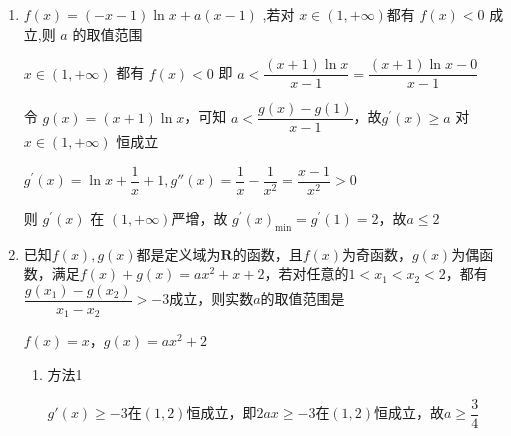\begin{enumerate}
\begin{enumerate}
\begin{jieda}
\begin{enumerate}
                \item 构造函数
                不妨设$x_1 > x_2$
                
                $\dfrac{f\left( {x}_{1}\right)  - f\left( {x}_{2}\right) }{{x}_{1} - {x}_{2}} > a \Longleftrightarrow f(x_1)-ax_1 > f(x_2)-ax_2$，即$F(x) = f(x)-ax$在$(0, +\infty)$为增函数，故$F'(x) = x-\dfrac{2a}{x}-2 \geq  0$在$x > 0$恒成立，故$x^2-2x \geq 2a$在$x > 0$恒成立，解得$a \in \left(-\infty, -\dfrac{1}{2}\right]$
            \end{enumerate}
        \end{jieda}

        \item $f\left( x\right)  = \left( {-x - 1}\right) \ln x + a\left( {x - 1}\right)$ ,若对 $x \in  \left( {1, + \infty }\right)$都有 $f\left( x\right)  < 0$ 成立,则 $a$ 的取值范围\blkda{$\left(-\infty, 2\right]$}
        \begin{jieda}
            $x \in  \left( {1, + \infty }\right)$ 都有 $f\left( x\right)  < 0$ 即 $a < \dfrac{\left( {x + 1}\right) \ln x}{x - 1} = \dfrac{\left( {x + 1}\right) \ln x - 0}{x - 1}$
            
            令 $g\left( x\right)  = \left( {x + 1}\right) \ln x$，可知 $a < \dfrac{g\left( x\right)  - g\left( 1\right) }{x - 1}$，故${g}^{\prime }\left( x\right)  \geq  a$ 对 $x \in  \left( {1, + \infty }\right)$ 恒成立 
            
            ${g}^{\prime }\left( x\right)  = \ln x + \dfrac{1}{x} + 1, g''\left( x\right)  = \dfrac{1}{x} - \dfrac{1}{{x}^{2}} = \dfrac{x - 1}{{x}^{2}} > 0$
            
            则 ${g}^{\prime }\left( x\right)$ 在 $\left( {1, + \infty }\right)$严增，故 ${g}^{\prime }\left( x\right)_{\min}  = {g}^{\prime }\left( 1\right)  = 2$，故$a \leq  2$ 
        \end{jieda}

        \item 已知$f(x), g(x)$都是定义域为$\mathbf{R}$的函数，且$f(x)$为奇函数，$g(x)$为偶函数，满足$f(x)+g(x) = ax^2+x+2$，若对任意的$1 < x_1 < x_2 < 2$，都有$\dfrac{g(x_1)-g(x_2)}{x_1-x_2} > -3$成立，则实数$a$的取值范围是\blkda{$\left[\dfrac{3}{4}, +\infty\right)$}
        \begin{jieda}
            $f(x) = x$，$g(x) = ax^2+2$
            \begin{enumerate}
                \item 方法1

                $g'(x) \geq -3$在$(1, 2)$恒成立，即$2ax \geq -3$在$(1, 2)$恒成立，故$a \geq \dfrac{3}{4}$


\end{enumerate}
\end{jieda}
\end{enumerate}
\end{enumerate}
